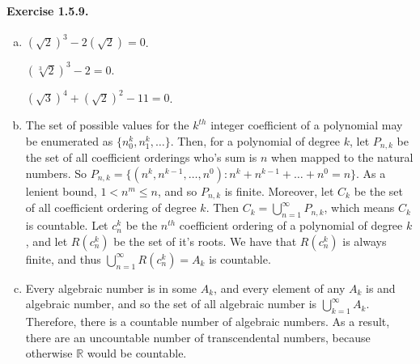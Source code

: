 \documentclass{article}
\newcommand{\R}{\mathbb{R}}
\begin{document}
\paragraph{Exercise 1.5.9.}
\begin{enumerate}[(a)]
    \item $(\sqrt{2})^3 - 2(\sqrt{2}) = 0$. 
    
    $(\sqrt[3]{2})^3 - 2 = 0$. 
    
    $(\sqrt{3})^4 + (\sqrt{2})^2 - 11 = 0$.
    \item The set of possible values for the $k^{th}$ integer coefficient of a polynomial may be enumerated as $\{n^k_0, n^k_1, \ldots \}$.  Then, for a polynomial of degree $k$, let $P_{n,k}$ be the set of all coefficient orderings who's sum is $n$ when mapped to the natural numbers. So $P_{n,k} = \{(n^k, n^{k-1}, \ldots, n^0) : n^k + n^{k-1} + \dots + n^0 = n\}$. As a lenient bound, $1 < n^m \leq n$, and so $P_{n,k}$ is finite. Moreover, let $C_k$ be the set of all coefficient ordering of degree $k$. Then $C_k = \bigcup_{n=1}^\infty P_{n,k}$, which means $C_k$ is countable. Let $c^k_n$ be the $n^{th}$ coefficient ordering of a polynomial of degree $k$, and let $R(c^k_n)$ be the set of it's roots. We have that $R(c^k_n)$ is always finite, and thus $\bigcup_{n=1}^\infty R(c^k_n) = A_k$ is countable.
    \item Every algebraic number is in some $A_k$, and every element of any $A_k$ is and algebraic number, and so the set of all algebraic number is $\bigcup_{k=1}^\infty A_k$. Therefore, there is a countable number of algebraic numbers. As a result, there are an uncountable number of transcendental numbers, because otherwise $\R$ would be countable.
\end{enumerate}
\end{document}
